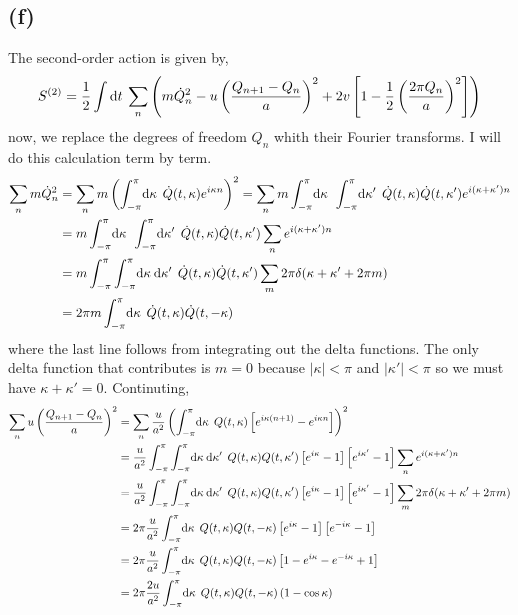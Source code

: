 \documentclass[12pt]{extarticle}
\begin{document}
\subsection*{(f)}
The second-order action is given by,
\[S^{(2)} = \frac{1}{2} \int \mathrm{d}t \: \sum_{n} \left(m \dot{Q}_n^2 - u \left(\frac{Q_{n+1} - Q_{n}}{a}\right)^2 + 2 v \left[1 - \frac{1}{2} \left(\frac{2 \pi Q_n}{a} \right)^2 \right] \right)\]
now, we replace the degrees of freedom $Q_n$ whith their Fourier transforms. I will do this calculation term by term.
\begin{align*}
\sum_{n} m \dot{Q}_n^2 & = \sum_n m \left( \int_{-\pi}^{\pi} \! \mathrm{d}\kappa \: \: \dot{Q}(t, \kappa) e^{i \kappa n} \right)^2 = \sum_{n} m \int_{-\pi}^{\pi} \! \mathrm{d}\kappa \: \: \int_{-\pi}^{\pi} \! \mathrm{d}\kappa' \: \: \dot{Q}(t, \kappa) \dot{Q}(t, \kappa') e^{i (\kappa + \kappa') n} \\
& =  m \int_{-\pi}^{\pi} \! \mathrm{d}\kappa \: \: \int_{-\pi}^{\pi} \! \mathrm{d}\kappa' \: \: \dot{Q}(t, \kappa) \dot{Q}(t, \kappa') \sum_{n} e^{i (\kappa + \kappa') n} \\ 
& = m \int_{-\pi}^{\pi} \int_{-\pi}^{\pi} \! \mathrm{d}\kappa \: \mathrm{d}\kappa' \: \: \dot{Q}(t, \kappa) \dot{Q}(t, \kappa')  \sum_{m} 2 \pi \delta(\kappa + \kappa' + 2 \pi m) \\
& = 2 \pi m \int_{-\pi}^{\pi} \! \mathrm{d}\kappa \: \: \dot{Q}(t, \kappa) \dot{Q}(t, -\kappa) 
\end{align*}
where the last line follows from integrating out the delta functions. The only delta function that contributes is $m = 0$ because $|\kappa| < \pi$ and $|\kappa'| < \pi$ so we must have $\kappa + \kappa' = 0$. Continuting,
\begin{align*}
\sum_{n} u \left(\frac{Q_{n+1} - Q_{n}}{a}\right)^2 & = \sum_n \frac{u}{a^2} \left( \int_{-\pi}^{\pi} \! \mathrm{d}\kappa \: \: Q(t, \kappa) \left[ e^{i \kappa (n+1)} - e^{i \kappa n} \right] \right)^2 \\ 
& = \frac{u}{a^2} \int_{-\pi}^{\pi} \int_{-\pi}^{\pi} \! \mathrm{d}\kappa \: \mathrm{d}\kappa' \: \: Q(t, \kappa) Q(t, \kappa') \left[ e^{i \kappa} -  1 \right] \left[ e^{i \kappa'} -  1 \right] \sum_n e^{i (\kappa + \kappa') n} \\ & = \frac{u}{a^2} \int_{-\pi}^{\pi} \int_{-\pi}^{\pi} \! \mathrm{d}\kappa \: \mathrm{d}\kappa' \: \: Q(t, \kappa) Q(t, \kappa') \left[ e^{i \kappa} -  1 \right] \left[ e^{i \kappa'} -  1 \right] \sum_m 2 \pi \delta(\kappa + \kappa' + 2 \pi m) \\
& = 2\pi \frac{u}{a^2} \int_{-\pi}^{\pi} \! \mathrm{d}\kappa \: \: Q(t, \kappa) Q(t, -\kappa) \left[ e^{i \kappa} -  1 \right] \left[ e^{-i \kappa} -  1 \right] \\
& = 2\pi \frac{u}{a^2} \int_{-\pi}^{\pi} \! \mathrm{d}\kappa \: \: Q(t, \kappa) Q(t, -\kappa) \left[ 1 - e^{i \kappa} - e^{- i \kappa} + 1 \right] \\
& = 2\pi \frac{2u}{a^2} \int_{-\pi}^{\pi} \! \mathrm{d}\kappa \: \: Q(t, \kappa) Q(t, -\kappa) \left(1 - \cos{\kappa}\right)
\end{align*}
\end{document}
